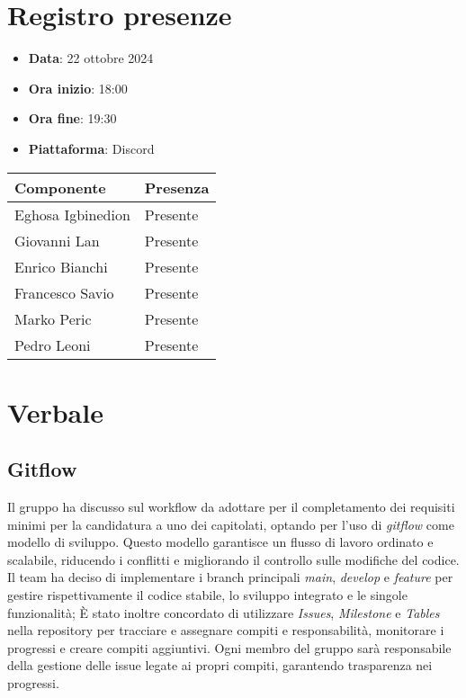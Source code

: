 \documentclass[a4paper, 12pt]{article}
\begin{document}
\section{Registro presenze}
   \begin{itemize}
        \item[] \textbf{Data}: 22 ottobre 2024
        \item[] \textbf{Ora inizio}: 18:00
        \item[] \textbf{Ora fine}: 19:30
        \item[] \textbf{Piattaforma}: Discord	
    \end{itemize}
\begin{table}[!h]
    \centering
    {\renewcommand{\arraystretch}{2}
    \begin{tabularx}{\textwidth}{| X | X |}
        \hline
            \textbf{\large Componente} & 
            \textbf{\large Presenza} \\ 
        \hline 
            Eghosa Igbinedion &
            Presente \\ 
        \hline 
            Giovanni Lan &
            Presente \\ 
        \hline 
            Enrico Bianchi &
            Presente \\ 
        \hline 
            Francesco Savio &
            Presente \\ 
        \hline 
            Marko Peric &
            Presente \\ 
        \hline 
            Pedro Leoni &
            Presente \\ 
        \hline 
    \end{tabularx}}
\end{table}

\newpage

\section{Verbale}
\subsection{Gitflow}
Il gruppo ha discusso sul workflow da adottare per il completamento dei requisiti minimi per la candidatura a uno dei capitolati, optando per l’uso di \textit{gitflow} come modello di sviluppo. Questo modello garantisce un flusso di lavoro ordinato e scalabile, riducendo i conflitti e migliorando il controllo sulle modifiche del codice. Il team ha deciso di implementare i branch principali \textit{main}, \textit{develop} e \textit{feature} per gestire rispettivamente il codice stabile, lo sviluppo integrato e le singole funzionalità;
È stato inoltre concordato di utilizzare \textit{Issues}, \textit{Milestone} e \textit{Tables} nella repository per tracciare e assegnare compiti e responsabilità, monitorare i progressi e creare compiti aggiuntivi. Ogni membro del gruppo sarà responsabile della gestione delle issue legate ai propri compiti, garantendo trasparenza nei progressi.
\end{document}
